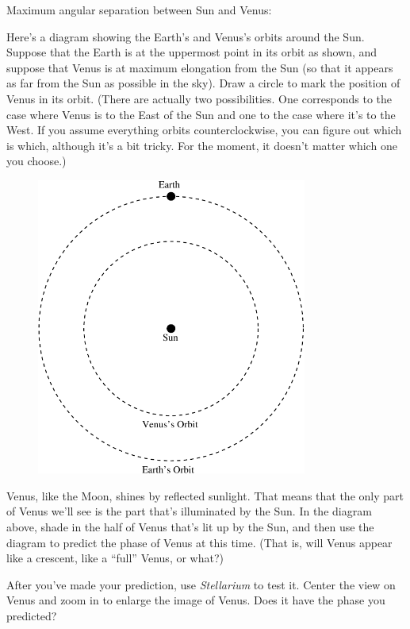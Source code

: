 Maximum angular separation between Sun and Venus:

\answerspace{ 0.7in}

Here's a diagram showing the Earth's and Venus's orbits around the
Sun.  Suppose that the Earth is at the uppermost point in its orbit as
shown, and suppose that Venus is at maximum elongation from the Sun
(so that it appears as far from the Sun as possible in the sky).  Draw
a circle to mark the position of Venus in its orbit.  (There are
actually two possibilities.  One corresponds to the case where Venus
is to the East of the Sun and one to the case where it's to the West.
If you assume everything orbits
counterclockwise, you can figure out which is which, although
it's a bit tricky.  For the moment, it doesn't matter which one you choose.)

\begin{figure}[h]
\centerline{\includegraphics[width=3.5in]{phasesofvenus/venus1.pdf}}
\end{figure}


Venus, like the Moon, shines by reflected sunlight.  That means that
the only part of Venus we'll see is the part that's illuminated by the 
Sun.  In the diagram above, shade in the half of Venus that's lit up by
the Sun, and then use the diagram to predict the phase of Venus
at this time.  (That is, will Venus appear like a crescent, like
a ``full'' Venus, or what?)

\answerspace{ 0.7in}

\pagebreak[2]
After you've made your prediction, use \textit{Stellarium}
to test it.
Center the view on Venus and zoom in to enlarge the image of Venus.
Does it have the phase you predicted?

